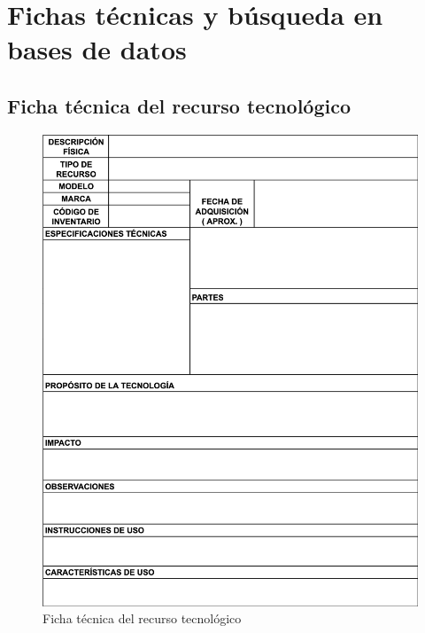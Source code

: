 \appendix

\chapter{Fichas técnicas y búsqueda en bases de datos}\label{apendice:fichas-y-busquedas}

\section*{Ficha técnica del recurso tecnológico}
\begin{figure}[htbp]
    \centering
    \includegraphics[width=\textwidth,height=0.85\textheight,keepaspectratio]{apendices/caracterizacionInfraestructura.png}
    \caption{Ficha técnica del recurso tecnológico}\label{fig:tabla-ficha-tecnica}
\end{figure}
\FloatBarrier

